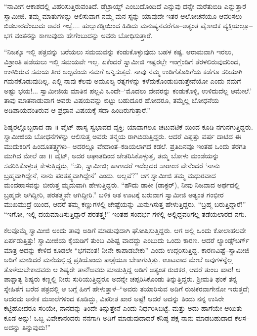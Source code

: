 “ನಾವೀಗ ಆಕಾಶದಲ್ಲಿ ವಿಹರಿಸುತ್ತಿರುವಂತಿದೆ. ಡೆಟ್ರಾಯ್ಟ್ ಎಂಬುದೊಂದಿದೆ ಎನ್ನುವು ದನ್ನೇ ಮರೆತುಬಿಡಿ ಎನ್ನುತ್ತಾರೆ ಸ್ವಾಮೀಜಿ. ತಮ್ಮ ಮಾತುಗಳನ್ನು ಆಲಿಸುವಾಗ ನಮ್ಮ ಮನ ಸ್ಸನ್ನು ಯಾವುದೇ ಇತರ ಆಲೋಚನೆಯೂ ಆವರಿಸಲು ಬಿಡಬಾರದೆಂಬುದು ಅವರ ಇಚ್ಛೆ.... ಹುಲ್ಲುಕಡ್ಡಿಯಿಂದ ಹಿಡಿದು ಮನುಷ್ಯನವರೆಗೂ–ಅತ್ಯಂತ ಪೈಶಾಚಿಕ ವ್ಯಕ್ತಿಯಲ್ಲೂ–ಭಗ ವಂತನನ್ನು ಕಾಣುವುದು ಹೇಗೆಂಬುದನ್ನು ಅವರು ಬೋಧಿಸುತ್ತಾರೆ.

“ನಿಜಕ್ಕೂ ಇಲ್ಲಿ ಪತ್ರವನ್ನು ಬರೆಯಲು ಸಮಯವನ್ನು ಕಂಡುಕೊಳ್ಳುವುದು ಬಹಳ ಕಷ್ಟ. ಆರಾಮವಾಗಿ ಇರಲು, ವಿಶ್ರಾಂತಿ ಪಡೆಯಲು ಇಲ್ಲಿ ಸಮಯವೇ ಇಲ್ಲ. ಏಕೆಂದರೆ ಸ್ವಾಮೀಜಿ ಇಷ್ಟರಲ್ಲೇ ಇಂಗ್ಲೆಂಡಿಗೆ ತೆರಳಲಿರುವುದರಿಂದ, ಉಳಿದಿರುವ ಸಮಯ ತೀರ ಅಲ್ಪವೆಂದು ನಮಗೆ ಅನ್ನಿಸುತ್ತದೆ. ನಾವು ನಮ್ಮ ಉಡಿಗೆತೊಡಿಗೆಯ ಕಡೆಗೂ ಸರಿಯಾಗಿ ಗಮನಕೊಡುವುದಿಲ್ಲ. ಎಲ್ಲಿ ನಾವು ಕೆಲವು ಅಮೂಲ್ಯ ರತ್ನಗಳನ್ನು ಕಳೆದುಕೊಂಡುಬಿಡುತ್ತೇವೆಯೋ ಎಂದು ನಮಗೆ ಅಷ್ಟು ಭಯ!... ಸ್ವಾಮೀಜಿಯ ಮಾತಿನ ಪಲ್ಲವಿ ಒಂದೇ–‘ಮೊದಲು ದೇವರನ್ನು ಕಂಡುಕೊಳ್ಳಿ, ಉಳಿದುದೆಲ್ಲ ಆಮೇಲೆ.’ ತಾವು ಮಾತನಾಡುವಾಗ ಅವರು ವಿಷಯವನ್ನು ಬಿಟ್ಟು ಬಹುದೂರ ಹೋದರೂ, ತಮ್ಮೆಲ್ಲ ಬೋಧನೆಯ ಅಡಿಪಾಯದಂತಿರುವ ಆ ಪ್ರಧಾನ ವಿಷಯಕ್ಕೆ ಸದಾ ಹಿಂದಿರುಗುತ್ತಾರೆ.”

ಶಿಷ್ಯರಲ್ಲೊಬ್ಬರಾದ ಡಾ ॥ ವೈಟ್ ಹಾಸ್ಯ ಸ್ವಭಾವದ ವ್ಯಕ್ತಿ; ಯಾವಾಗಲೂ ಚಟುವಟಿಕೆ ಯಿಂದ ಕೂಡಿ ನಗುನಗುತ್ತಿದ್ದರು. ಸ್ವಾಮೀಜಿಯ ಬೋಧನೆಗಳನ್ನು ಆಲಿಸುತ್ತ ಅವರು ತನ್ಮಯ ರಾಗಿಬಿಡುತ್ತಿದ್ದರು. ಆದರೆ ಎಪ್ಪತ್ತು ವರ್ಷ ದಾಟಿದ ಈ ಮುದುಕರಿಗೆ ಹಿಂದೂತತ್ತ್ವಗಳು– ಅದರಲ್ಲೂ ವೇದಾಂತ–ಕಡಿಯಲಾಗದ ಕಡಲೆ. ಪ್ರತಿದಿನವೂ ಇಂತಹ ಒಂದು ತರಗತಿ ಮುಗಿದ ಮೇಲೆ ಡಾ ॥ ವೈಟ್, ಅದರ ಆಘಾತದಿಂದ ಚೇತರಿಸಿಕೊಳ್ಳುತ್ತ, ತಮ್ಮ ಬೋಳು ಮಂಡೆಯನ್ನು ಸವರಿಸಿಕೊಳ್ಳುತ್ತ ಕೇಳುತ್ತಿದ್ದರು, “ಸರಿ, ಸ್ವಾಮೀಜಿ; ಹಾಗಾದರೆ ಇದೆಲ್ಲದರ ಸಾರಾಂಶ ವೇನೆಂದರೆ ‘ನಾನು ಬ್ರಹ್ಮವಾಗಿದ್ದೇನೆ, ನಾನು ಪರತತ್ತ್ವವಾಗಿದ್ದೇನೆ’ ಎಂದು. ಅಲ್ಲವೆ?” ಆಗ ಸ್ವಾಮೀಜಿ ತಮ್ಮ ಮಧುರವಾದ ಮಂದಹಾಸವನ್ನು ಬೀರುತ್ತ ಮೃದುವಾಗಿ ಹೇಳುತ್ತಿದ್ದರು. “ಹೌದು ಡಾಕೀ (ಡಾಕ್ಟರ್​), ನೀವು ನಿಜವಾದ ಅರ್ಥದಲ್ಲಿ ಬ್ರಹ್ಮವೇ ಆಗಿದ್ದೀರಿ, ಪರತತ್ತ್ವವೇ ಆಗಿದ್ದೀರಿ.” ಬಳಿಕ ಆತ ಊಟಕ್ಕೆ ಬರುವಾಗ ಸ್ವಾಮೀಜಿ ಅತ್ಯಂತ ಗಂಭೀರ ಮುಖಮುದ್ರೆ ಯಿಂದ, ಆದರೆ ತಮ್ಮ ಕಣ್ಣುಗಳಲ್ಲಿ ಚೇಷ್ಟೆಯನ್ನು ಮಿನುಗಿಸುತ್ತ ಹೇಳುತ್ತಿದ್ದರು, “ಬ್ರಹ್ಮ ಬರುತ್ತಿದ್ದಾರೆ!” “ಇಗೋ, ಇಲ್ಲಿ ದಯಮಾಡಿಸುತ್ತಿದ್ದಾರೆ ಪರತತ್ತ್ವ!” ಇಂತಹ ಸಂದರ್ಭ ಗಳಲ್ಲಿ ಅಲ್ಲಿದ್ದವರಿಗೆಲ್ಲ ತಡೆಯಲಾರದ ನಗು.

ಕೆಲವೊಮ್ಮೆ ಸ್ವಾಮೀಜಿ ಅಂದು ತಾವು ಅಡಿಗೆ ಮಾಡುವುದಾಗಿ ಘೋಷಿಸುತ್ತಿದ್ದರು. ಆಗ ಅಲ್ಲಿ ಒಂದು ಕೋಲಾಹಲವೇ ಏರ್ಪಡುತ್ತಿತ್ತು! ಸ್ವಾಮೀಜಿಯ ಕೈಯಡಿಗೆ ತುಂಬ ವಿಶಿಷ್ಟ ವಾದದ್ದು ಎಂಬುದು ಒಂದು ಕಾರಣ. ಆದರೆ ಲ್ಯಾಂಡ್ಸ್​ಬರ್ಗ್ ಮಾತ್ರ ಅದನ್ನು ಕೇಳಿದ ಕೂಡಲೇ “ಭಗವಂತ! ನೀನೇ ಕಾಪಾಡಬೇಕು” ಎಂದು ಉದ್ಗರಿಸುತ್ತಿದ್ದ. ಕಾರಣವಿಷ್ಟೆ–ಸ್ವಾಮೀಜಿ ಅಡಿಗೆ ಮಾಡಿದರೆ ಮನೆಯಲ್ಲಿದ್ದ ಪ್ರತಿಯೊಂದು ಪಾತ್ರೆಯೂ ಬೇಕಾಗುತ್ತಿತ್ತು. ಊಟವಾದ ಮೇಲೆ ಅವುಗಳನ್ನೆಲ್ಲ ತೊಳೆಯಬೇಕಾದವರು ಆ ಶಿಷ್ಯರೇ ತಾನೆ!ಅವರು ಮಾಡುತ್ತಿದ್ದ ಅಡಿಗೆ ಅತ್ಯಂತ ರುಚಿಕರ, ಆದರೆ ತುಂಬ ಖಾರ! ಆ ಪಾಶ್ಚಾತ್ಯ ಶಿಷ್ಯರು ಕಣ್ಣಲ್ಲಿ ನೀರು ಸುರಿಯುತ್ತಿದ್ದರೂ ಅದನ್ನೇ ಚಪ್ಪರಿಸಿಕೊಂಡು ತಿನ್ನುತ್ತಿದ್ದರು. ಶ್ರೀಮತಿ ಫಂಕೆ ತನ್ನ ಸ್ನೇಹಿತೆಗೆ ಬರೆದ ಪತ್ರದಲ್ಲಿ ಆ ಬಗ್ಗೆ ಹೀಗೆ ಹೇಳುತ್ತಾಳೆ–“ಅವರು ತಯಾರಿಸುವ ಅಡಿಗೆ ರುಚಿಕರವಾಗೇನೋ ಇರುತ್ತದೆ; ಆದರದು ಅನೇಕ ಮಸಾಲೆಗಳಿಂದ ಕೂಡಿದ್ದು, ವಿಪರೀತ ಖಾರ ಅಷ್ಟೆ! ಆದರೆ ಅದನ್ನು ತಿಂದು ನನ್ನ ಉಸಿರೇ ಕಟ್ಟಿಹೋದರೂ ಸರಿಯೇ, ನಾನದನ್ನು ತಿಂದೇ ತಿನ್ನುತ್ತೇನೆ ಎಂದು ನಿರ್ಧರಿಸಿಬಿಟ್ಟೆ. ಮತ್ತು ಅದು ಹಾಗೆಯೇ ಆಯಿತು ಕೂಡ ಅನ್ನು! ಒಬ್ಬ ವಿವೇಕಾನಂದರು ನನಗಾಗಿ ಅಡಿಗೆ ಮಾಡುವುದಾದರೆ ಕನಿಷ್ಠ ಪಕ್ಷ ನಾನು ಮಾಡಬಹುದಾದ ಕೆಲಸ–ಅದನ್ನು ತಿನ್ನುವುದು!”

